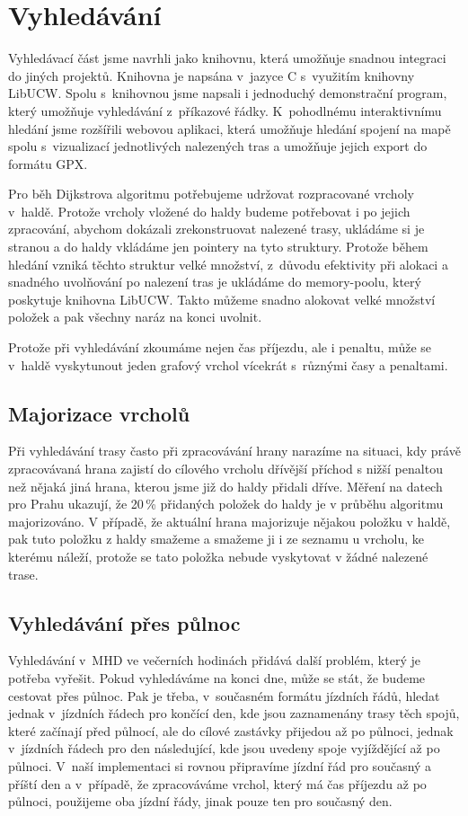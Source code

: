 \section{Vyhledávání}
\label{ch:implementace:vyhledavani}
Vyhledávací část jsme navrhli jako knihovnu, která umožňuje snadnou integraci do
jiných projektů. Knihovna je napsána v~jazyce C s~využitím knihovny LibUCW.
Spolu s~knihovnou jsme napsali i jednoduchý demonstrační program, který umožňuje
vyhledávání z~příkazové řádky. K~pohodlnému interaktivnímu hledání jsme
rozšířili webovou aplikaci, která umožňuje hledání spojení na mapě spolu
s~vizualizací jednotlivých nalezených tras a umožňuje jejich export do formátu
GPX.

Pro běh Dijkstrova algoritmu potřebujeme udržovat rozpracované vrcholy v~haldě.
Protože vrcholy vložené do haldy budeme potřebovat i po jejich zpracování,
abychom dokázali zrekonstruovat nalezené trasy, ukládáme si je stranou a do
haldy vkládáme jen pointery na tyto struktury. Protože během hledání vzniká
těchto struktur velké množství, z~důvodu efektivity při alokaci a snadného
uvolňování po nalezení tras je ukládáme do memory-poolu, který poskytuje
knihovna LibUCW. Takto můžeme snadno alokovat velké množství položek a pak
všechny naráz na konci uvolnit.

Protože při vyhledávání zkoumáme nejen čas příjezdu, ale i penaltu, může se
v~haldě vyskytunout jeden grafový vrchol vícekrát s~různými časy a penaltami.

\subsection{Majorizace vrcholů}
Při vyhledávání trasy často při zpracovávání hrany narazíme na situaci, kdy
právě zpracovávaná hrana zajistí do cílového vrcholu dřívější příchod s nižší
penaltou než nějaká jiná hrana, kterou jsme již do haldy přidali dříve. Měření
na datech pro Prahu ukazují, že 20\,\% přidaných položek do haldy je v průběhu
algoritmu majorizováno. V případě, že aktuální hrana majorizuje nějakou položku
v haldě, pak tuto položku z haldy smažeme a smažeme ji i ze seznamu u vrcholu,
ke kterému náleží, protože se tato položka nebude vyskytovat v žádné nalezené
trase.

\subsection{Vyhledávání přes půlnoc}
Vyhledávání v~MHD ve večerních hodinách přidává další problém, který je potřeba
vyřešit. Pokud vyhledáváme na konci dne, může se stát, že budeme cestovat přes
půlnoc. Pak je třeba, v~současném formátu jízdních řádů, hledat jednak
v~jízdních řádech pro končící den, kde jsou zaznamenány trasy těch spojů, které
začínají před půlnocí, ale do cílové zastávky přijedou až po půlnoci, jednak
v~jízdních řádech pro den následující, kde jsou uvedeny spoje vyjíždějící až po
půlnoci. V~naší implementaci si rovnou připravíme jízdní řád pro současný a
příští den a v~případě, že zpracováváme vrchol, který má čas příjezdu až po
půlnoci, použijeme oba jízdní řády, jinak pouze ten pro současný den.

